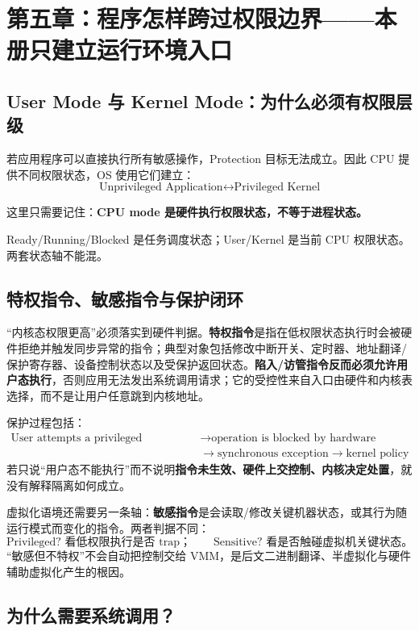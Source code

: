 \documentclass[11pt,a4paper]{ctexart}
\newcommand{\kw}[1]{\textbf{#1}}
\begin{document}
\section{第五章：程序怎样跨过权限边界——本册只建立运行环境入口}

\subsection{User Mode 与 Kernel Mode：为什么必须有权限层级}

若应用程序可以直接执行所有敏感操作，Protection 目标无法成立。因此 CPU 提供不同权限状态，OS 使用它们建立：
\[
\boxed{\text{Unprivileged Application}\leftrightarrow\text{Privileged Kernel}}
\]

这里只需要记住：\kw{CPU mode 是硬件执行权限状态，不等于进程状态。}

Ready/Running/Blocked 是任务调度状态；User/Kernel 是当前 CPU 权限状态。两套状态轴不能混。

\subsection{特权指令、敏感指令与保护闭环}

“内核态权限更高”必须落实到硬件判据。\kw{特权指令}是指在低权限状态执行时会被硬件拒绝并触发同步异常的指令；典型对象包括修改中断开关、定时器、地址翻译/保护寄存器、设备控制状态以及受保护返回状态。\kw{陷入/访管指令反而必须允许用户态执行}，否则应用无法发出系统调用请求；它的受控性来自入口由硬件和内核表选择，而不是让用户任意跳到内核地址。

保护过程包括：
\[
\boxed{
\begin{aligned}
\text{User attempts a privileged operation}
&\to \text{operation is blocked by hardware}\\
&\to \text{synchronous exception}
\to \text{kernel policy}
\end{aligned}
}
\]
若只说“用户态不能执行”而不说明\kw{指令未生效、硬件上交控制、内核决定处置}，就没有解释隔离如何成立。

虚拟化语境还需要另一条轴：\kw{敏感指令}是会读取/修改关键机器状态，或其行为随运行模式而变化的指令。两者判据不同：
\[
\boxed{
\text{Privileged? 看低权限执行是否 trap；}
\qquad
\text{Sensitive? 看是否触碰虚拟机关键状态。}
}
\]
“敏感但不特权”不会自动把控制交给 VMM，是后文二进制翻译、半虚拟化与硬件辅助虚拟化产生的根因。

\subsection{为什么需要系统调用？}
\end{document}
